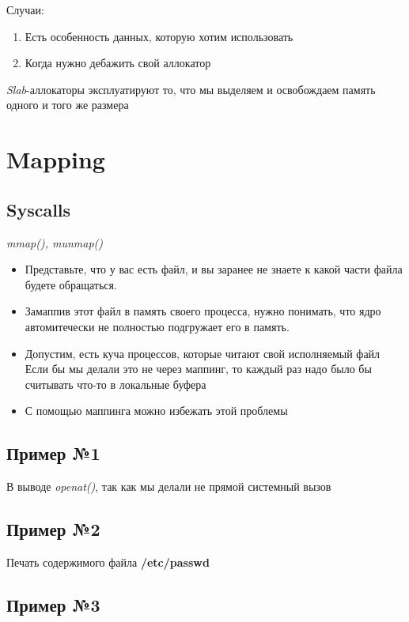 \documentclass[../../lectures.tex]{subfiles}
\begin{document}
Случаи:
\begin{enumerate}
    \item Есть особенность данных, которую хотим использовать
    \item Когда нужно дебажить свой аллокатор
\end{enumerate}
\emph{Slab}-аллокаторы эксплуатируют то, что мы выделяем и освобождаем память одного и того же размера

\section{Mapping}
\subsection{Syscalls}
\emph{mmap(), munmap()}
\begin{itemize}
    \item Представьте, что у вас есть файл, и вы заранее не знаете к какой части файла будете обращаться.
    \item Замаппив этот файл в память своего процесса, нужно понимать, что ядро автомитечески не полностью подгружает его в память.
    \item Допустим, есть куча процессов, которые читают свой исполняемый файл\\
          Если бы мы делали это не через маппинг, то каждый раз надо было бы считывать что-то в локальные буфера
    \item С помощью маппинга можно избежать этой проблемы
\end{itemize}

\newpage
\subsection{Пример №1}
В выводе \emph{openat()}, так как мы делали не прямой системный вызов

\newpage
\subsection{Пример №2}
Печать содержимого файла \textbf{/etc/passwd}

\newpage
\subsection{Пример №3}
\end{document}
